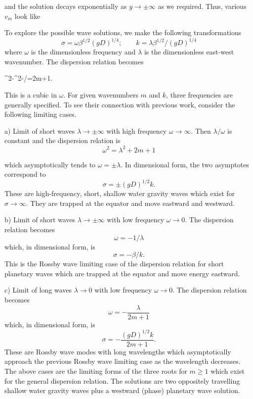 \sourcepagebreak

and the solution decays exponentially as $y\to\pm\infty$ as we required. Thus,
various $v_m$ look like


To explore the possible wave solutions, we make the following transformations
\[
	\sigma=\omega\beta^{1/2}(gD)^{1/4};
	\qquad
	k=\lambda\beta^{1/2}/(gD)^{1/4}
\]
where $\omega$ is the dimensionless frequency and $\lambda$ is the dimensionless
east-west wavenumber. The dispersion relation becomes
\begin{waveequation}
	\omega^2-\lambda^2-\lambda/\omega=2m+1.
\end{waveequation}
This is a cubic in $\omega$. For given wavenumbers $m$ and $k$, three
frequencies are generally specified. To see their connection with previous work,
consider the following limiting cases.

\noindent a) Limit of short waves $\lambda\to\pm\infty$ with high frequency
$\omega\to\infty$. Then $\lambda/\omega$ is constant and the dispersion relation is
\[
	\omega^2=\lambda^2+2m+1
\]

\sourcepagebreak

which asymptotically tends to $\omega=\pm\lambda$. In dimensional form, the two
asymptotes correspond to
\[
	\sigma=\pm(gD)^{1/2}k.
\]
These are high-frequency, short, shallow water gravity waves which exist for
$\sigma\to\infty$. They are trapped at the equator and move eastward and westward.

\noindent b) Limit of short waves $\lambda\to\pm\infty$ with low frequency
$\omega\to0$. The dispersion relation becomes
\[
	\omega=-1/\lambda
\]
which, in dimensional form, is
\[
	\sigma=-\beta/k.
\]
This is the Rossby wave limiting case of the dispersion relation for short planetary
waves which are trapped at the equator and move energy eastward.

\noindent c) Limit of long waves $\lambda\to0$ with low frequency $\omega\to0$.
The dispersion relation becomes
\[
	\omega=-\frac{\lambda}{2m+1}
\]
which, in dimensional form, is
\[
	\sigma=-\frac{(gD)^{1/2}k}{2m+1}.
\]
These are Rossby wave modes with long wavelengths which asymptotically approach the
previous Rossby wave limiting case as the wavelength decreases. The above cases are
the limiting forms of the three roots for $m\ge1$ which exist for the general
dispersion relation. The solutions are two oppositely travelling shallow water gravity
waves plus a westward (phase) planetary wave solution.

